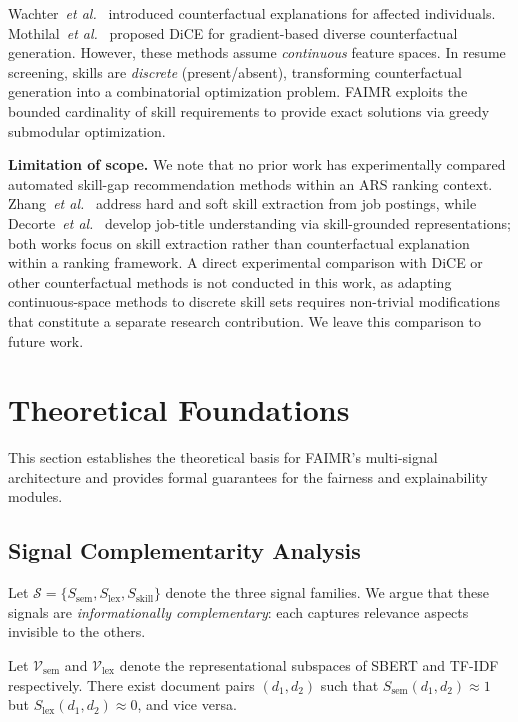 \documentclass{svproc}
\begin{document}
Wachter~\textit{et al.}~\cite{wachter2017counterfactual} introduced counterfactual explanations for affected individuals. Mothilal~\textit{et al.}~\cite{mothilal2020dice} proposed DiCE for gradient-based diverse counterfactual generation. However, these methods assume \textit{continuous} feature spaces. In resume screening, skills are \textit{discrete} (present/absent), transforming counterfactual generation into a combinatorial optimization problem. FAIMR exploits the bounded cardinality of skill requirements to provide exact solutions via greedy submodular optimization.

\textbf{Limitation of scope.} We note that no prior work has experimentally compared automated skill-gap recommendation methods within an ARS ranking context. Zhang~\textit{et al.}~\cite{zhang2022skillspan} address hard and soft skill extraction from job postings, while Decorte~\textit{et al.}~\cite{decorte2022jobbert} develop job-title understanding via skill-grounded representations; both works focus on skill extraction rather than counterfactual explanation within a ranking framework. A direct experimental comparison with DiCE or other counterfactual methods is not conducted in this work, as adapting continuous-space methods to discrete skill sets requires non-trivial modifications that constitute a separate research contribution. We leave this comparison to future work.

\section{Theoretical Foundations}\label{sec:theory}

This section establishes the theoretical basis for FAIMR's multi-signal architecture and provides formal guarantees for the fairness and explainability modules.

\subsection{Signal Complementarity Analysis}

Let $\mathcal{S} = \{S_\text{sem}, S_\text{lex}, S_\text{skill}\}$ denote the three signal families. We argue that these signals are \textit{informationally complementary}: each captures relevance aspects invisible to the others.

\begin{proposition}\label{prop:orth}
Let $\mathcal{V}_\text{sem}$ and $\mathcal{V}_\text{lex}$ denote the representational subspaces of SBERT and TF-IDF respectively. There exist document pairs $(d_1, d_2)$ such that $S_\text{sem}(d_1, d_2) \approx 1$ but $S_\text{lex}(d_1, d_2) \approx 0$, and vice versa.
\end{proposition}
\end{document}
